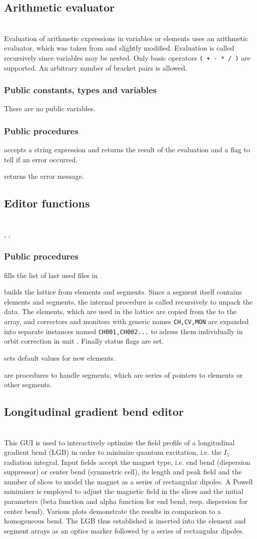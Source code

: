 \documentclass[12pt]{article}
\newcommand\code[1]{{\tt #1}}
\newcommand{\unico}[1]{{\color{burntorange}\code{#1}}}
\newcommand{\opagui}[1]{\colorbox{blue!20}{{\color{black}\code{#1}}}}
\newcommand{\oguih}[2]{\subsection{\label{#2}#1}{\Huge\opagui{#2}}\\}
\newcommand{\ogui}[1]{\hyperref[#1]{\opagui{#1}}}
\newcommand{\opauni}[1]{\colorbox{orange!30}{{\color{black}\code{#1}}}}
\newcommand{\ounih}[2]{\subsection{\label{#2}#1}{\Huge\opauni{#2}}\\}
\newcommand{\ouni}[1]{\hyperref[#1]{\opauni{#1}}}
\newcommand{\uses}[1]{\flushleft {\bf Uses:} #1}
\newcommand{\desc}[1]{#1}
\newcommand{\pvar}[1]{\subsubsection*{Public constants, types and variables} #1}
\newcommand{\ppro}[1]{\subsubsection*{Public procedures} #1}
\begin{document}
\ounih{Arithmetic evaluator}{varlib} 

\desc{
Evaluation of arithmetic expressions in variables or elements uses an arithmetic evaluator, which was taken from \cite{rosetta} and slightly modified. Evaluation is called recursively since variables may be nested. Only basic operators \code{( + - * / )} are supported. An arbitrary number of bracket pairs is allowed.
}

\uses{\ouni{globlib}}

\pvar{There are no public variables.}

\ppro{
\unico{Eval\_Exp} accepts a string expression and returns the result of the evaluation and a flag to tell if an error occurred.

\unico{Get\_Eval\_exp\_errmess} returns the error message.
}



\ounih{Editor functions}{editorlib} 
\desc{
}
\uses{\ouni{globlib}, \ouni{mathlib}, \ouni{comauxlib}}

\ppro{}

\unico{FillComboSeg} fills the list of last used files in \ogui{opamenu}.

\unico{MakeLattice} builds the lattice from elements and segments. Since a segment itself contains elements and segments, the internal procedure \unico{SegLat} is called recursively to unpack the data. 
The elements, which are used in the lattice are copied from the \unico{Elem} to the \unico{Ella} array, and correctors and monitors with generic names \code{CH,CV,MON}
are expanded into separate instances named \code{CH001,CH002...} to adress them individually in orbit correction in unit \ogui{opaorbit}. Finally status flags are set.


\unico{IniElem} sets default values for new elements.

\unico{AppendAE, ClearSeg, NAESeg} are procedures to handle segments, which are series of pointers to elements or other segments.




\oguih{Longitudinal gradient bend editor}{opalgbedit} 

\desc{This GUI is used to interactively optimize the field profile of a longitudinal gradient bend (LGB) in order to minimize quantum excitation, i.e. the $I_5$ radiation integral. Input fields accept the magnet type, i.e. end bend (dispersion suppressor) or center bend (symmetric cell), its length and peak field and the number of slices to model the magnet as a series of rectangular dipoles. A Powell minimizer is employed to adjust the magnetic field in the slices and the initial parameters (beta function and alpha function for end bend, resp. dispersion for center bend). Various plots demonstrate the results in comparison to a homogeneous bend. The LGB thus established is inserted into the element and segment arrays as an optics marker followed by a series of rectangular dipoles.}
\end{document}
